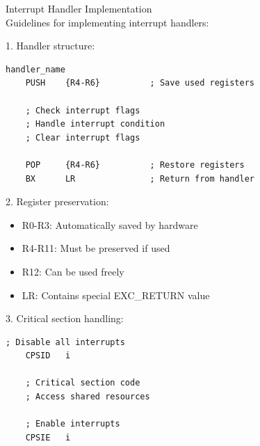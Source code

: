 \begin{KR}{Interrupt Handler Implementation}\\
Guidelines for implementing interrupt handlers:

1. Handler structure:
\begin{lstlisting}[language=armasm, style=basesmol]
handler_name
    PUSH    {R4-R6}          ; Save used registers
    
    ; Check interrupt flags
    ; Handle interrupt condition
    ; Clear interrupt flags
    
    POP     {R4-R6}          ; Restore registers
    BX      LR               ; Return from handler
\end{lstlisting}

2. Register preservation:
\begin{itemize}
  \item R0-R3: Automatically saved by hardware
  \item R4-R11: Must be preserved if used
  \item R12: Can be used freely
  \item LR: Contains special EXC\_RETURN value
\end{itemize}

3. Critical section handling:
\begin{lstlisting}[language=armasm, style=basesmol]
    ; Disable all interrupts
    CPSID   i
    
    ; Critical section code
    ; Access shared resources
    
    ; Enable interrupts
    CPSIE   i
\end{lstlisting}
\end{KR}

